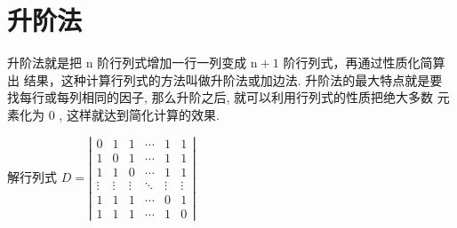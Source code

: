 \section{升阶法}

升阶法就是把 $\mathrm{n}$ 阶行列式增加一行一列变成 $\mathrm{n}+1$ 阶行列式，再通过性质化简算出 结果，这种计算行列式的方法叫做升阶法或加边法. 升阶法的最大特点就是要 找每行或每列相同的因子, 那么升阶之后, 就可以利用行列式的性质把绝大多数 元素化为 0 , 这样就达到简化计算的效果.

\begin{example}
    解行列式 $D=\left|\begin{array}{cccccc}
        0 & 1 & 1 & \cdots & 1 & 1 \\
        1 & 0 & 1 & \cdots & 1 & 1 \\
        1 & 1 & 0 & \cdots & 1 & 1 \\
        \vdots & \vdots & \vdots & \ddots & \vdots & \vdots \\
        1 & 1 & 1 & \cdots & 0 & 1 \\
        1 & 1 & 1 & \cdots & 1 & 0
        \end{array}\right|$
\end{example}

